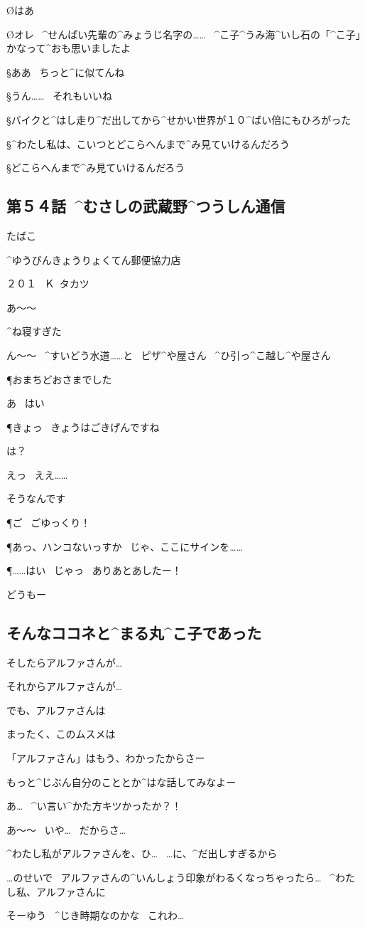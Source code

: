 \O はあ

\page
\O オレ
\ ^{せんぱい}{先輩}の^{みょうじ}{名字}の……
\ ^{こ}{子}^{うみ}{海}^{いし}{石}の「^{こ}{子}」かなって^{おも}{思}いましたよ

\S ああ
\ ちっと^{に}{似}てんね

\S うん……
\ それもいいね

\page
\S バイクと^{はし}{走}り^{だ}{出}してから^{せかい}{世界}が１０^{ばい}{倍}にもひろがった

\page
\S ^{わたし}{私}は、こいつとどこらへんまで^{み}{見}ていけるんだろう

\page[152]
\S どこらへんまで^{み}{見}ていけるんだろう


\subsection{第５４話\ ^{むさしの}{武蔵野}^{つうしん}{通信}}

\page[155]
\Sign たばこ

\Sign ^{ゆうびんきょうりょくてん}{郵便協力店}

\page
\Sign ２０１
\ Ｋ\ タカツ

\page[158]
\K あ〜〜

\K ^{ね}{寝}すぎた

\K ん〜〜
\ ^{すいどう}{水道}……と
\ ピザ^{や}{屋}さん
\ ^{ひ}{引}っ^{こ}{越}し^{や}{屋}さん

\page[164]
\P おまちどおさまでした

\K あ
\ はい

\P きょっ
\ きょうはごきげんですね

\K は？

\K えっ
\ ええ……

\page
\K そうなんです

\P ご
\ ごゆっくり！

\page[167]
\P あっ、ハンコないっすか
\ じゃ、ここにサインを……

\P ……はい
\ じゃっ
\ ありあとあしたー！

\A どうもー


\subsection{そんなココネと^{まる}{丸}^{こ}{子}であった}

\K そしたらアルファさんが…

\K それからアルファさんが…

\K でも、アルファさんは

\R まったく、このムスメは

\R 「アルファさん」はもう、わかったからさー

\R もっと^{じぶん}{自分}のこととか^{はな}{話}してみなよー

\R あ…
\ ^{い}{言}い^{かた}{方}キツかったか？！

\R あ〜〜
\ いや…
\ だからさ…

\K ^{わたし}{私}がアルファさんを、ひ…
\ …に、^{だ}{出}しすぎるから

\K …のせいで
\ アルファさんの^{いんしょう}{印象}がわるくなっちゃったら…
\ ^{わたし}{私}、アルファさんに

\R そーゆう
\ ^{じき}{時期}なのかな
\ これわ…
